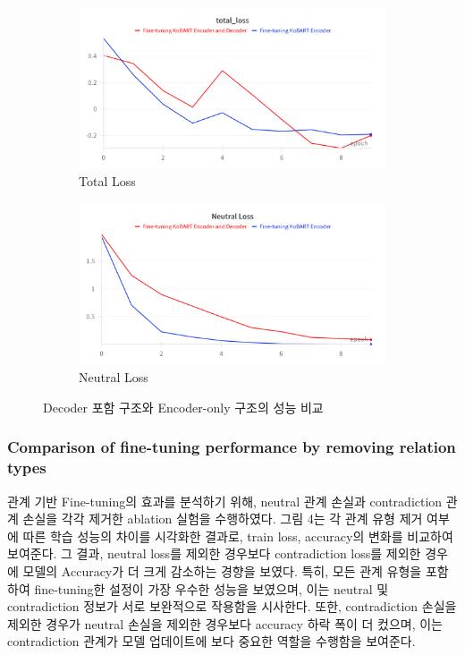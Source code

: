\documentclass[a4paper,fleqn]{cas-sc}
\begin{document}
\begin{figure}[htbp]
    \vspace{0.4cm}  %
    \begin{subfigure}[b]{0.4\textwidth}
        \centering
        \includegraphics[width=\textwidth]{1_total_loss.png}
        \caption{Total Loss}
        \label{fig:f1}
    \end{subfigure}
    \hspace{0.02\textwidth}
    \begin{subfigure}[b]{0.4\textwidth}
        \centering
        \includegraphics[width=\textwidth]{1_neutral_loss.png}
        \caption{Neutral Loss}
        \label{fig:prec}
    \end{subfigure}
    
    \caption{Decoder 포함 구조와 Encoder-only 구조의 성능 비교}
    \label{fig:performance_grid}
    \end{figure}

   
\subsubsection{Comparison of fine-tuning performance by removing relation types}
\FloatBarrier
관계 기반 Fine-tuning의 효과를 분석하기 위해, neutral 관계 손실과 contradiction 관계 손실을 각각 제거한 ablation 실험을 수행하였다.
그림 4는 각 관계 유형 제거 여부에 따른 학습 성능의 차이를 시각화한 결과로, train loss, accuracy의 변화를 비교하여 보여준다.  
그 결과, neutral loss를 제외한 경우보다 contradiction loss를 제외한 경우에 모델의 Accuracy가 더 크게 감소하는 경향을 보였다.  
특히, 모든 관계 유형을 포함하여 fine-tuning한 설정이 가장 우수한 성능을 보였으며, 이는 neutral 및 contradiction 정보가 서로 보완적으로 작용함을 시사한다.  
또한, contradiction 손실을 제외한 경우가 neutral 손실을 제외한 경우보다 accuracy 하락 폭이 더 컸으며, 이는 contradiction 관계가 모델 업데이트에 보다 중요한 역할을 수행함을 보여준다.
\end{document}
